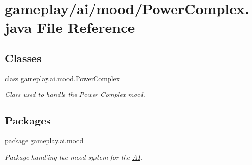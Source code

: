\hypertarget{a00048}{\section{gameplay/ai/mood/\-Power\-Complex.java File Reference}
\label{a00048}
}
\subsection*{Classes}
\begin{DoxyCompactItemize}
\item 
class \hyperlink{a00020}{gameplay.\-ai.\-mood.\-Power\-Complex}
\begin{DoxyCompactList}\small\item\em Class used to handle the Power Complex mood. \end{DoxyCompactList}\end{DoxyCompactItemize}
\subsection*{Packages}
\begin{DoxyCompactItemize}
\item 
package \hyperlink{a00083}{gameplay.\-ai.\-mood}
\begin{DoxyCompactList}\small\item\em Package handling the mood system for the \hyperlink{a00001}{A\-I}. \end{DoxyCompactList}\end{DoxyCompactItemize}
